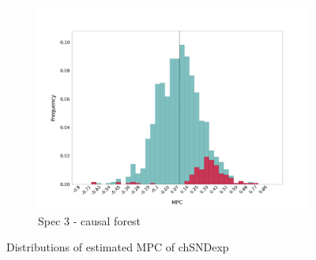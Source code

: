 \begin{figure}[t]
\begin{subfigure}{0.33\linewidth}
        \includegraphics[width=\linewidth]{figures/distributions/spec3_cf_chSNDexp.png}
        \caption{Spec 3 - causal forest}
    \end{subfigure}\hfill
    \caption{Distributions of estimated MPC of chSNDexp}
\end{figure}

